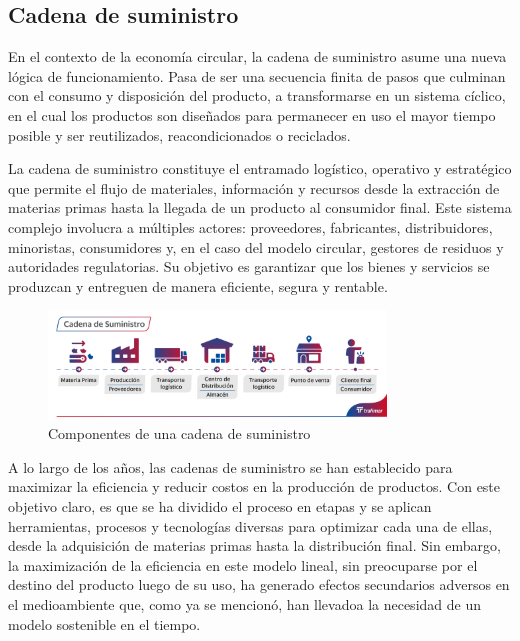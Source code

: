 \subsection{Cadena de suministro}

En el contexto de la economía circular, la cadena de suministro asume una nueva lógica de funcionamiento. Pasa de ser una secuencia finita de pasos que culminan con el consumo y disposición del producto, a transformarse en un sistema cíclico, en el cual los productos son diseñados para permanecer en uso el mayor tiempo posible y ser reutilizados, reacondicionados o reciclados. 

La cadena de suministro constituye el entramado logístico, operativo y estratégico que permite el flujo de materiales, información y recursos desde la extracción de materias primas hasta la llegada de un producto al consumidor final. Este sistema complejo involucra a múltiples actores: proveedores, fabricantes, distribuidores, minoristas, consumidores y, en el caso del modelo circular, gestores de residuos y autoridades regulatorias. Su objetivo es garantizar que los bienes y servicios se produzcan y entreguen de manera eficiente, segura y rentable. 

\begin{figure}[!htpb]
    \centering
    \includegraphics[width=0.8\textwidth]{Figures/supply-chain.png}
    \caption{Componentes de una cadena de suministro}
    \label{fig:supply-chain}
\end{figure}

A lo largo de los años, las cadenas de suministro se han establecido para maximizar la eficiencia y reducir costos en la producción de productos. Con este objetivo claro, es que se ha dividido el proceso en etapas y se aplican herramientas, procesos y tecnologías diversas para optimizar cada una de ellas, desde la adquisición de materias primas hasta la distribución final. Sin embargo, la maximización de la eficiencia en este modelo lineal, sin preocuparse por el destino del producto luego de su uso, ha generado efectos secundarios adversos en el medioambiente que, como ya se mencionó, han llevadoa la necesidad de un modelo sostenible en el tiempo.

